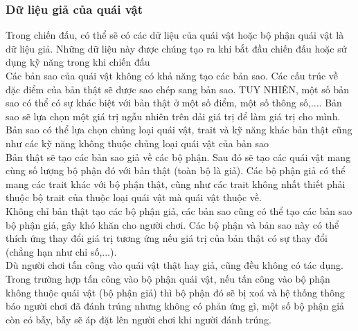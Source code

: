 \subsubsection{Dữ liệu giả của quái vật}
\hspace*{0.5cm} Trong chiến đấu, có thể sẽ có các dữ liệu của quái vật hoặc bộ phận quái vật là dữ liệu giả. Những dữ liệu này được chúng tạo ra khi bắt đầu chiến đấu hoặc sử dụng kỹ năng trong khi chiến đấu\\
\hspace*{0.5cm} Các bản sao của quái vật không có khả năng tạo các bản sao. Các cấu trúc về đặc điểm của bản thật sẽ được sao chép sang bản sao. TUY NHIÊN, một số bản sao có thể có sự khác biệt với bản thật ở một số điểm, một số thông số,.... Bản sao sẽ lựa chọn một giá trị ngẫu nhiên trên dải giá trị để làm giá trị cho mình. Bản sao có thể lựa chọn chủng loại quái vật, trait và kỹ năng khác bản thật cũng như các kỹ năng không thuộc chủng loại quái vật của bản sao\\
\hspace*{0.5cm} Bản thật sẽ tạo các bản sao giả về các bộ phận. Sau đó sẽ tạo các quái vật mang cùng số lượng bộ phận đó với bản thật (toàn bộ là giả). Các bộ phận giả có thể mang các trait khác với bộ phận thật, cũng như các trait không nhất thiết phải thuộc bộ trait của thuộc loại quái vật mà quái vật thuộc về. \\
\hspace*{0.5cm} Không chỉ bản thật tạo các bộ phận giả, các bản sao cũng có thể tạo các bản sao bộ phận giả, gây khó khăn cho người chơi. Các bộ phận và bản sao này có thể thích ứng thay đổi giá trị tương ứng nếu giá trị của bản thật có sự thay đổi (chẳng hạn như chỉ số,...). \\
\hspace*{0.5cm} Dù người chơi tấn công vào quái vật thật hay giả, cũng đều không có tác dụng. Trong trường hợp tấn công vào bộ phận quái vật, nếu tấn công vào bộ phận không thuộc quái vật (bộ phận giả) thì bộ phận đó sẽ bị xoá và hệ thống thông báo người chơi đã đánh trúng nhưng không có phản ứng gì, một số bộ phận giả còn có bẫy, bẫy sẽ áp đặt lên người chơi khi người đánh trúng.\\




